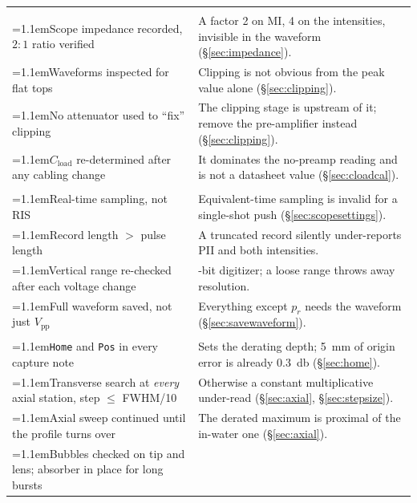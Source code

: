\documentclass[11pt,a4paper]{article}
\begin{document}
\newcommand{\ckhead}[1]{\multicolumn{2}{@{}l}{\textbf{#1}}\\[2pt]}
\newcommand{\ckitem}[1]{\hangindent=1.1em\hspace*{1.1em}#1}
{\small\setlength{\LTpre}{6pt}\setlength{\LTpost}{6pt}
\begin{longtable}{@{}>{\raggedright\arraybackslash}p{}>{\raggedright\arraybackslash}p{}@{}}
\toprule
\endhead
\ckhead{Electrical chain}
\ckitem{Scope impedance recorded, $2{:}1$ ratio verified} &
  A factor 2 on MI, 4 on the intensities, invisible in the waveform (\S\ref{sec:impedance}). \\
\ckitem{Waveforms inspected for flat tops} &
  Clipping is not obvious from the peak value alone (\S\ref{sec:clipping}). \\
\ckitem{No attenuator used to ``fix'' clipping} &
  The clipping stage is upstream of it; remove the pre-amplifier instead (\S\ref{sec:clipping}). \\
\ckitem{$C_\mathrm{load}$ re-determined after any cabling change} &
  It dominates the no-preamp reading and is not a datasheet value (\S\ref{sec:cloadcal}). \\
\addlinespace
\ckhead{Digitizer}
\ckitem{Real-time sampling, not RIS} &
  Equivalent-time sampling is invalid for a single-shot push (\S\ref{sec:scopesettings}). \\
\ckitem{Record length $>$ pulse length} &
  A truncated record silently under-reports PII and both intensities. \\
\ckitem{Vertical range re-checked after each voltage change} &
  8-bit digitizer; a loose range throws away resolution. \\
\ckitem{Full waveform saved, not just $V_\mathrm{pp}$} &
  Everything except $p_r$ needs the waveform (\S\ref{sec:savewaveform}). \\
\addlinespace
\ckhead{Positioning}
\ckitem{\texttt{Home} and \texttt{Pos} in every capture note} &
  Sets the derating depth; \SI{5}{\milli\metre} of origin error is already \SI{0.3}{\decibel}
  (\S\ref{sec:home}). \\
\ckitem{Transverse search at \emph{every} axial station, step $\le$ FWHM/10} &
  Otherwise a constant multiplicative under-read (\S\ref{sec:axial}, \S\ref{sec:stepsize}). \\
\ckitem{Axial sweep continued until the profile turns over} &
  The derated maximum is proximal of the in-water one (\S\ref{sec:axial}). \\
\ckitem{Bubbles checked on tip and lens; absorber in place for long bursts} &

\end{longtable}}
\end{document}

